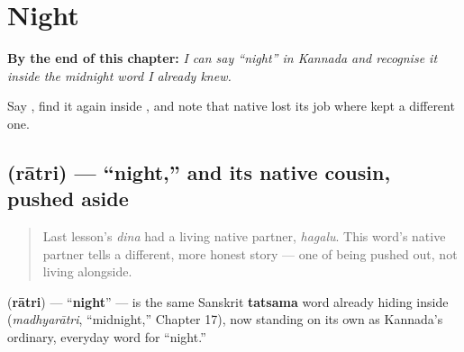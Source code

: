 
\chapter{Night}
\label{ch:ka-night}

\begin{chapteropening}
\textbf{By the end of this chapter:} \emph{I can say \textquotedblleft{}night\textquotedblright{} in Kannada and recognise it inside the midnight word I already knew.}

Say , find it again inside , and note that native  lost its job where  kept a different one.
\end{chapteropening}

\section[\texorpdfstring{\kn{ರಾತ್ರಿ} (rātri)}{ರಾತ್ರಿ (rātri)}]{ (rātri) — \textquotedblleft{}night,\textquotedblright{} and its native cousin, pushed aside}

\label{lesson:KA-C24-ratri}



\begin{quote}
Last lesson's \emph{dina} had a living native partner, \emph{hagalu}. This word's native partner tells a different, more honest story — one of being pushed out, not living alongside.
\end{quote}

\begin{cousinweb}
\textbf{} (\textbf{rātri}) — \textquotedblleft{}\textbf{night}\textquotedblright{} — is the same Sanskrit \textbf{tatsama} word already hiding inside \textbf{} (\emph{madhyarātri}, \textquotedblleft{}midnight,\textquotedblright{} Chapter 17), now standing on its own as Kannada's ordinary, everyday word for \textquotedblleft{}night.\textquotedblright{}
\end{cousinweb}

